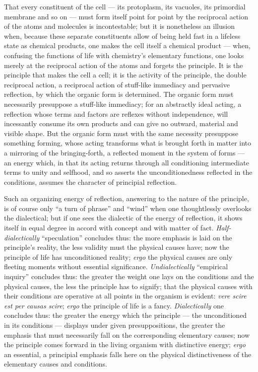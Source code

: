 \documentclass[12pt,a4paper]{book}
\begin{document}
That every constituent of the cell --- its protoplasm, its vacuoles, its
primordial membrane and so on --- must form itself point for point by the
reciprocal action of the atoms and molecules is incontestable; but it is
nonetheless an illusion when, because these separate constituents allow of
being held fast in a lifeless state as chemical products, one makes the cell
itself a chemical product --- when, confusing the functions of life with
chemistry's elementary functions, one looks merely at the reciprocal action of
the atoms and forgets the principle. It is the principle that makes the cell a
cell; it is the activity of the principle, the double reciprocal action, a
reciprocal action of stuff-like immediacy and pervasive reflection, by which the
organic form is determined. The organic form must necessarily presuppose a
stuff-like immediacy; for an abstractly ideal acting, a reflection whose terms
and factors are reflexes without independence, will incessantly consume its own
products and can give no outward, material
and visible shape. But the organic form must with the same necessity presuppose
something forming, whose acting transforms what is brought forth in matter into
a mirroring of the bringing-forth, a reflected moment in the system of forms
--- an energy which, in that its acting returns through all conditioning
intermediate terms to unity and selfhood, and so asserts the unconditionedness
reflected in the conditions, assumes the character of principial reflection.

Such an organizing energy of reflection, answering to the nature of the
principle, is of course only ``a turn of phrase'' and ``wind'' when one
thoughtlessly overlooks the dialectical; but if one sees the dialectic of the
energy of reflection, it shows itself in equal degree in accord with concept
and with matter of fact. \emph{Half-dialectically} ``speculation'' concludes
thus: the more emphasis is laid on the principle's reality, the less validity
must the physical causes have; now the principle of life has unconditioned
reality; \textit{ergo} the physical causes are only fleeting moments without
essential significance. \emph{Undialectically} ``empirical inquiry'' concludes
thus: the greater the weight one lays on the conditions and the physical
causes, the less the principle has to signify; that the physical causes with
their conditions are operative at all points in the organism is evident:
\textit{vere scire est per causas scire}; \textit{ergo} the principle of life
is a fancy. \emph{Dialectically} one concludes thus: the greater the energy
which the principle --- the unconditioned in its conditions --- displays under
given presuppositions, the greater the emphasis that must necessarily fall on
the corresponding elementary causes; now the principle comes forward in the
living organism with distinctive energy; \textit{ergo} an essential, a
principial emphasis falls here on the physical distinctiveness of the
elementary causes and conditions.
\end{document}
